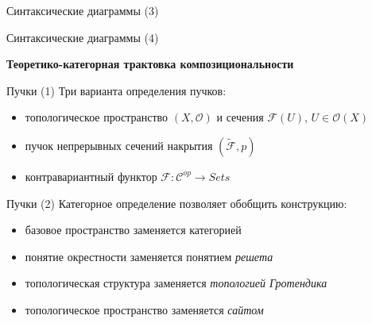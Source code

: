 \documentclass{beamer}
\begin{document}
\begin{frame}{Синтаксические диаграммы (3)}
\end{frame}

\begin{frame}{Синтаксические диаграммы (4)}
\end{frame}





\begin{frame}{}
\begin{center}
	\textbf{Теоретико-категорная трактовка композициональности}
\end{center}
\end{frame}

\begin{frame}{Пучки (1)}
Три варианта определения пучков:\\
\medskip
\begin{small}
\begin{itemize}
	\item топологическое пространство $(X, \mathcal{O})$ и сечения $\mathcal{F}(U)$, $U \in \mathcal{O}(X)$
	\item пучок непрерывных сечений накрытия $(\widetilde{\mathcal{F}}, p)$
	\item контравариантный функтор $\mathcal{F} : \mathcal{C}^{op} \to Sets$
\end{itemize}
\end{small}
\end{frame}

\begin{frame}{Пучки (2)}
Категорное определение позволяет обобщить конструкцию:\\
\medskip
\begin{small}
\begin{itemize}
	\item базовое пространство заменяется категорией
	\item понятие окрестности заменяется понятием \textit{решета}
	\item топологическая структура заменяется \textit{топологией Гротендика}
	\item топологическое пространство заменяется \textit{сайтом}
\end{itemize}
\end{small}
\end{frame}
\end{document}
